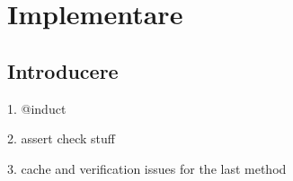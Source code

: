 \chapter{Implementare}

\section{Introducere}

1. @induct

2. assert check stuff

3. cache and verification issues for the last method

